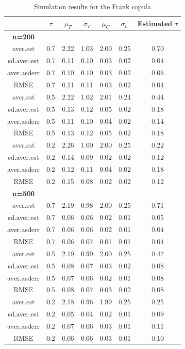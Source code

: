 \begin{table}[h]
    \centering
    \caption{Simulation results for the Frank copula}
    \begin{tabular}{|c|c|c|c|c|c|c|}
        \hline
        & \(\tau\) & \(\mu_T\) & \(\sigma_T\) & \(\mu_C\) & \(\sigma_C\) & Estimated \(\tau\) \\ 
        \hline
        \textbf{n=200} & & & & & & \\
        \hline
        aver.est    & 0.7 & 2.22 & 1.03 & 2.00 & 0.25 & 0.70 \\ 
        sd.aver.est & 0.7 & 0.11 & 0.10 & 0.03 & 0.02 & 0.04 \\ 
        aver.asderr & 0.7 & 0.10 & 0.10 & 0.03 & 0.02 & 0.06 \\ 
        RMSE        & 0.7 & 0.11 & 0.11 & 0.03 & 0.02 & 0.04 \\ 
        \hline
        aver.est    & 0.5 & 2.22 & 1.02 & 2.01 & 0.24 & 0.44 \\ 
        sd.aver.est & 0.5 & 0.13 & 0.12 & 0.05 & 0.02 & 0.18 \\ 
        aver.asderr & 0.5 & 0.11 & 0.10 & 0.04 & 0.02 & 0.14 \\ 
        RMSE        & 0.5 & 0.13 & 0.12 & 0.05 & 0.02 & 0.18 \\ 
        \hline
        aver.est    & 0.2 & 2.26 & 1.00 & 2.00 & 0.25 & 0.22 \\ 
        sd.aver.est & 0.2 & 0.14 & 0.09 & 0.02 & 0.02 & 0.12 \\ 
        aver.asderr & 0.2 & 0.12 & 0.11 & 0.04 & 0.02 & 0.18 \\ 
        RMSE        & 0.2 & 0.15 & 0.08 & 0.02 & 0.02 & 0.12 \\ 
        \hline
        \textbf{n=500} & & & & & & \\
        \hline
        aver.est    & 0.7 & 2.19 & 0.98 & 2.00 & 0.25 & 0.71 \\ 
        sd.aver.est & 0.7 & 0.06 & 0.06 & 0.02 & 0.01 & 0.05 \\ 
        aver.asderr & 0.7 & 0.06 & 0.06 & 0.02 & 0.01 & 0.04 \\ 
        RMSE        & 0.7 & 0.06 & 0.07 & 0.01 & 0.01 & 0.04 \\ 
        \hline
        aver.est    & 0.5 & 2.19 & 0.99 & 2.00 & 0.25 & 0.47 \\ 
        sd.aver.est & 0.5 & 0.08 & 0.07 & 0.03 & 0.02 & 0.08 \\ 
        aver.asderr & 0.5 & 0.07 & 0.06 & 0.02 & 0.01 & 0.08 \\ 
        RMSE        & 0.5 & 0.08 & 0.07 & 0.03 & 0.02 & 0.08 \\ 
        \hline
        aver.est    & 0.2 & 2.18 & 0.96 & 1.99 & 0.25 & 0.25 \\ 
        sd.aver.est & 0.2 & 0.05 & 0.04 & 0.02 & 0.01 & 0.09 \\ 
        aver.asderr & 0.2 & 0.07 & 0.06 & 0.03 & 0.01 & 0.11 \\ 
        RMSE        & 0.2 & 0.06 & 0.06 & 0.03 & 0.01 & 0.10 \\ 
        \hline
    \end{tabular}
    \label{tab:frank_results}
\end{table}

